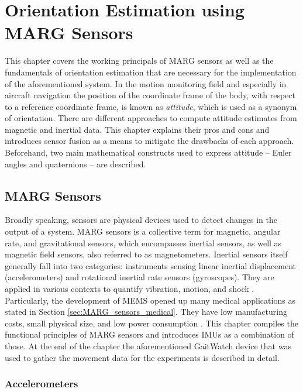 \chapter{Orientation Estimation using MARG Sensors}
\label{ch:orientation_estimation}

This chapter covers the working principals of MARG sensors as well as the fundamentals of orientation estimation that are necessary for the implementation of the aforementioned system. In the motion monitoring field and especially in aircraft navigation the position of the coordinate frame of the body, with respect to a reference coordinate frame, is known as \emph{attitude}, which is used as a synonym of orientation. There are different approaches to compute attitude estimates from magnetic and inertial data. This chapter explains their pros and cons and introduces sensor fusion as a means to mitigate the drawbacks of each approach. Beforehand, two main mathematical constructs used to express attitude -- Euler angles and quaternions -- are described.

\section{MARG Sensors}

Broadly speaking, sensors are physical devices used to detect changes in the output of a system. MARG sensors is a collective term for magnetic, angular rate, and gravitational sensors, which encompasses inertial sensors, as well as magnetic field sensors, also referred to as magnetometers. Inertial sensors itself generally fall into two categories: instruments sensing linear inertial displacement (accelerometers) and rotational inertial rate sensors (gyroscopes). They are applied in various contexts to quantify vibration, motion, and shock \cite{bhattacharyya_inertial_sensors_applications_13}. Particularly, the development of \gls{MEMS} opened up many medical applications as stated in Section \ref{sec:MARG_sensors_medical}. They have low manufacturing costs, small physical size, and low power consumption \cite{bhattacharyya_inertial_sensors_applications_13}. This chapter compiles the functional principles of MARG sensors and introduces \glspl{IMU} as a combination of those. At the end of the chapter the aforementioned GaitWatch device that was used to gather the movement data for the experiments is described in detail.

\subsection{Accelerometers}

